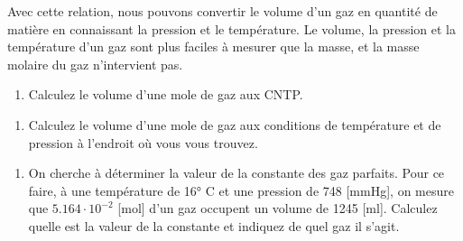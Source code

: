 \documentclass[
  11pt,
  french,
  a4paper,
  openany]{book}
\providecommand{\tightlist}{%
  \setlength{\itemsep}{0pt}\setlength{\parskip}{0pt}}
\begin{document}
Avec cette relation, nous pouvons convertir le volume d'un gaz en quantité de matière en connaissant la pression et le température. Le volume, la pression et la température d'un gaz sont plus faciles à mesurer que la masse, et la masse molaire du gaz n'intervient pas.

\begin{Exercise}

\begin{enumerate}
\def\labelenumi{\arabic{enumi}.}
\tightlist
\item
  Calculez le volume d'une mole de gaz aux CNTP.
\end{enumerate}


\begin{enumerate}
\def\labelenumi{\arabic{enumi}.}
\setcounter{enumi}{1}
\tightlist
\item
  Calculez le volume d'une mole de gaz aux conditions de température et de pression à l'endroit où vous vous trouvez.
\end{enumerate}


\begin{enumerate}
\def\labelenumi{\arabic{enumi}.}
\setcounter{enumi}{2}
\tightlist
\item
  On cherche à déterminer la valeur de la constante des gaz parfaits. Pour ce faire, à une température de 16° C et une pression de 748 {[}mmHg{]}, on mesure que \(5.164 \cdot 10^{-2}\) {[}mol{]} d'un gaz occupent un volume de 1245 {[}ml{]}. Calculez quelle est la valeur de la constante et indiquez de quel gaz il s'agit.
\end{enumerate}



\end{Exercise}
\end{document}
